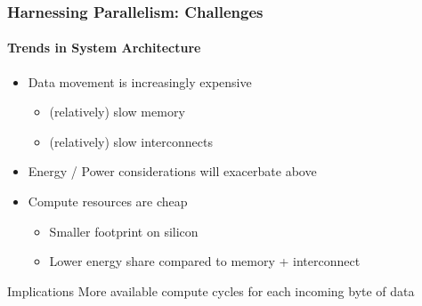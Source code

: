\begin{frame}[t]
\frametitle{Harnessing Parallelism: Challenges}
\framesubtitle{Trends in System Architecture}
    \begin{itemize}
        \item Data movement is increasingly expensive
            \begin{itemize}
                \item (relatively) slow memory
                \item (relatively) slow interconnects
            \end{itemize}
        \item Energy / Power considerations will exacerbate above
        \pause
        \item Compute resources are cheap
            \begin{itemize}
                \item Smaller footprint on silicon
                \item Lower energy share compared to memory + interconnect
            \end{itemize}
    \end{itemize}
    \pause
    \begin{block}{Implications}
       More available compute cycles for each incoming byte of data
    \end{block}
\end{frame}



